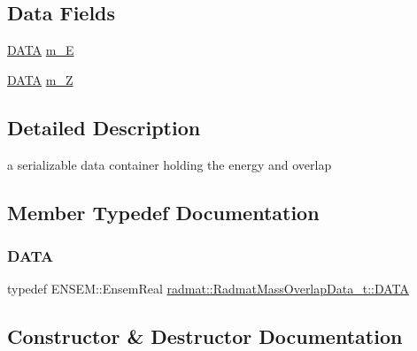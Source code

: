 \subsection*{Data Fields}
\begin{DoxyCompactItemize}
\item 
\mbox{\hyperlink{structradmat_1_1RadmatMassOverlapData__t_ab3de1245b76e79f9867e3af00989e5b6}{D\+A\+TA}} \mbox{\hyperlink{structradmat_1_1RadmatMassOverlapData__t_a3320a8f40f6721b4c404af41a9508886}{m\+\_\+E}}
\item 
\mbox{\hyperlink{structradmat_1_1RadmatMassOverlapData__t_ab3de1245b76e79f9867e3af00989e5b6}{D\+A\+TA}} \mbox{\hyperlink{structradmat_1_1RadmatMassOverlapData__t_ad626db20e01f0d55e0fd230094273066}{m\+\_\+Z}}
\end{DoxyCompactItemize}


\subsection{Detailed Description}
a serializable data container holding the energy and overlap 

\subsection{Member Typedef Documentation}
\mbox{\label{structradmat_1_1RadmatMassOverlapData__t_ab3de1245b76e79f9867e3af00989e5b6}} 
\subsubsection{\texorpdfstring{DATA}{DATA}}
{\footnotesize\ttfamily typedef E\+N\+S\+E\+M\+::\+Ensem\+Real \mbox{\hyperlink{structradmat_1_1RadmatMassOverlapData__t_ab3de1245b76e79f9867e3af00989e5b6}{radmat\+::\+Radmat\+Mass\+Overlap\+Data\+\_\+t\+::\+D\+A\+TA}}}



\subsection{Constructor \& Destructor Documentation}
\mbox{\label{structradmat_1_1RadmatMassOverlapData__t_af0318fa5b4c4d312b12e898ef4de7510}} 
